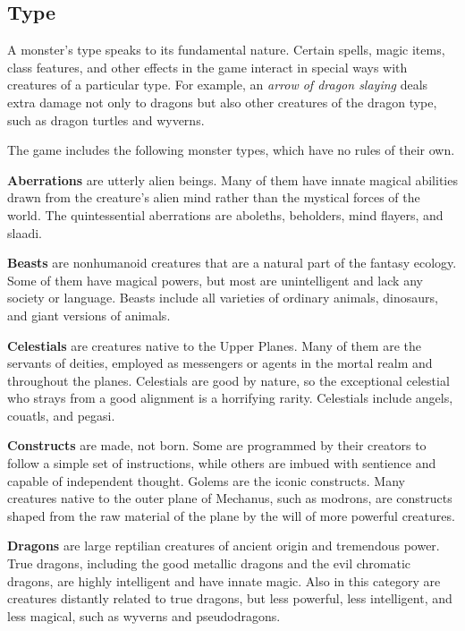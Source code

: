 \documentclass[
]{article}
\begin{document}
\hypertarget{type}{%
\subsection{Type}\label{type}}

A monster's type speaks to its fundamental nature. Certain spells, magic
items, class features, and other effects in the game interact in special
ways with creatures of a particular type. For example, an \emph{arrow of
dragon slaying} deals extra damage not only to dragons but also other
creatures of the dragon type, such as dragon turtles and wyverns.

The game includes the following monster types, which have no rules of
their own.

\textbf{Aberrations} are utterly alien beings. Many of them have innate
magical abilities drawn from the creature's alien mind rather than the
mystical forces of the world. The quintessential aberrations are
aboleths, beholders, mind flayers, and slaadi.

\textbf{Beasts} are nonhumanoid creatures that are a natural part of the
fantasy ecology. Some of them have magical powers, but most are
unintelligent and lack any society or language. Beasts include all
varieties of ordinary animals, dinosaurs, and giant versions of animals.

\textbf{Celestials} are creatures native to the Upper Planes. Many of
them are the servants of deities, employed as messengers or agents in
the mortal realm and throughout the planes. Celestials are good by
nature, so the exceptional celestial who strays from a good alignment is
a horrifying rarity. Celestials include angels, couatls, and pegasi.

\textbf{Constructs} are made, not born. Some are programmed by their
creators to follow a simple set of instructions, while others are imbued
with sentience and capable of independent thought. Golems are the iconic
constructs. Many creatures native to the outer plane of Mechanus, such
as modrons, are constructs shaped from the raw material of the plane by
the will of more powerful creatures.

\textbf{Dragons} are large reptilian creatures of ancient origin and
tremendous power. True dragons, including the good metallic dragons and
the evil chromatic dragons, are highly intelligent and have innate
magic. Also in this category are creatures distantly related to true
dragons, but less powerful, less intelligent, and less magical, such as
wyverns and pseudodragons.
\end{document}
